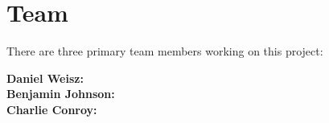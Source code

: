 \documentclass[11pt,preprint]{aastex}
\begin{document}

\clearpage

\section{Team}

There are three primary team members working on this project:

\textbf{Daniel Weisz:} \\

\textbf{Benjamin Johnson:} \\

\textbf{Charlie Conroy:}





\end{document}
